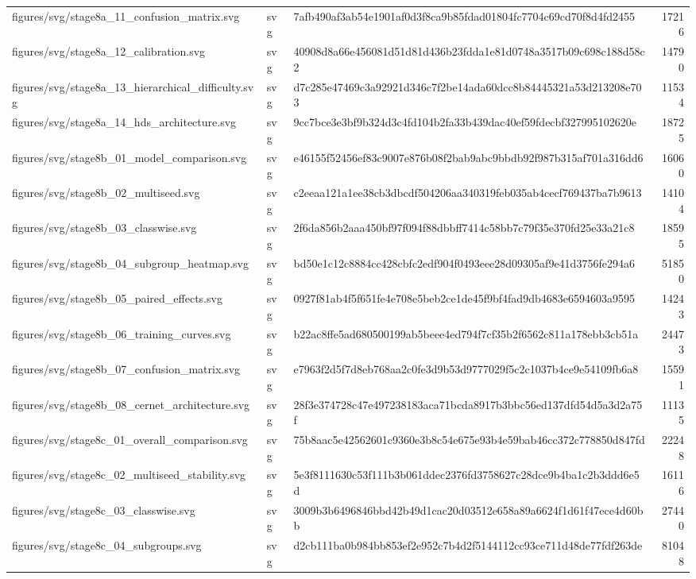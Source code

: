 \begin{tabular}{lllr}
figures/svg/stage8a_11_confusion_matrix.svg & svg & 7afb490af3ab54e1901af0d3f8ca9b85fdad01804fc7704c69cd70f8d4fd2455 & 17216 \\
figures/svg/stage8a_12_calibration.svg & svg & 40908d8a66e456081d51d81d436b23fdda1e81d0748a3517b09c698c188d58c2 & 14790 \\
figures/svg/stage8a_13_hierarchical_difficulty.svg & svg & d7c285e47469c3a92921d346c7f2be14ada60dcc8b84445321a53d213208e703 & 11534 \\
figures/svg/stage8a_14_hds_architecture.svg & svg & 9cc7bce3e3bf9b324d3c4fd104b2fa33b439dac40ef59fdecbf327995102620e & 18725 \\
figures/svg/stage8b_01_model_comparison.svg & svg & e46155f52456ef83c9007e876b08f2bab9abc9bbdb92f987b315af701a316dd6 & 16060 \\
figures/svg/stage8b_02_multiseed.svg & svg & c2eeaa121a1ee38cb3dbcdf504206aa340319feb035ab4cecf769437ba7b9613 & 14104 \\
figures/svg/stage8b_03_classwise.svg & svg & 2f6da856b2aaa450bf97f094f88dbbff7414c58bb7c79f35e370fd25e33a21c8 & 18595 \\
figures/svg/stage8b_04_subgroup_heatmap.svg & svg & bd50e1c12c8884cc428cbfc2edf904f0493eee28d09305af9e41d3756fe294a6 & 51850 \\
figures/svg/stage8b_05_paired_effects.svg & svg & 0927f81ab4f5f651fe4e708e5beb2ce1de45f9bf4fad9db4683e6594603a9595 & 14243 \\
figures/svg/stage8b_06_training_curves.svg & svg & b22ac8ffe5ad680500199ab5beee4ed794f7cf35b2f6562c811a178ebb3cb51a & 24473 \\
figures/svg/stage8b_07_confusion_matrix.svg & svg & e7963f2d5f7d8eb768aa2c0fe3d9b53d9777029f5c2c1037b4ce9e54109fb6a8 & 15591 \\
figures/svg/stage8b_08_cernet_architecture.svg & svg & 28f3e374728c47e497238183aca71bcda8917b3bbc56ed137dfd54d5a3d2a75f & 11135 \\
figures/svg/stage8c_01_overall_comparison.svg & svg & 75b8aac5e42562601c9360e3b8c54e675e93b4e59bab46cc372c778850d847fd & 22248 \\
figures/svg/stage8c_02_multiseed_stability.svg & svg & 5e3f8111630c53f111b3b061ddec2376fd3758627c28dce9b4ba1c2b3ddd6e5d & 16116 \\
figures/svg/stage8c_03_classwise.svg & svg & 3009b3b6496846bbd42b49d1cac20d03512e658a89a6624f1d61f47ece4d60bb & 27440 \\
figures/svg/stage8c_04_subgroups.svg & svg & d2cb111ba0b984bb853ef2e952c7b4d2f5144112cc93ce711d48de77fdf263de & 81048 \\

\end{tabular}
